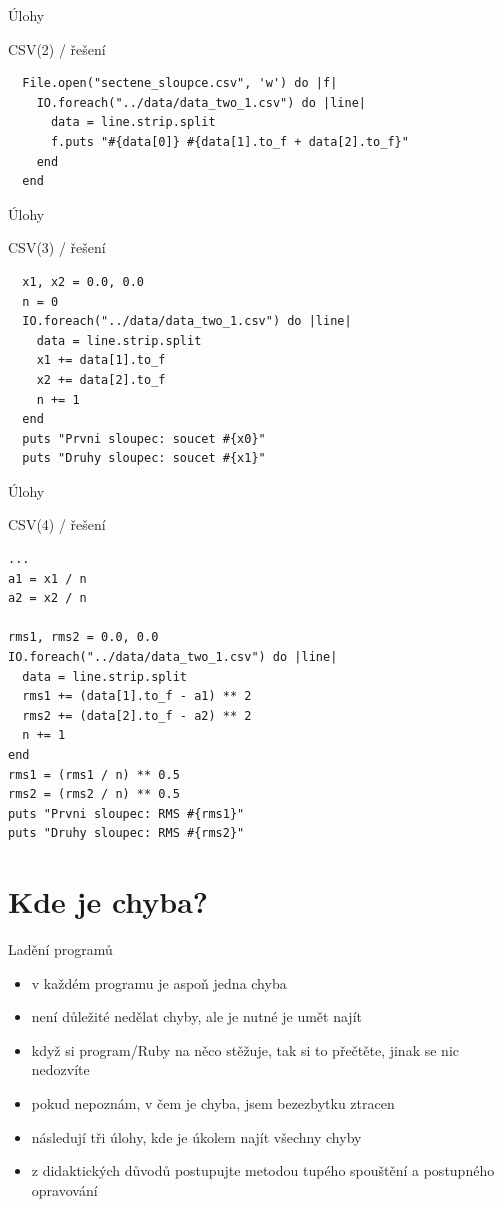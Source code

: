 \documentclass{beamer}
\begin{document}
\begin{frame}[fragile]{Úlohy}
  \begin{block}{CSV(2) / řešení}
    \scriptsize
\begin{verbatim}
  File.open("sectene_sloupce.csv", 'w') do |f|
    IO.foreach("../data/data_two_1.csv") do |line|
      data = line.strip.split
      f.puts "#{data[0]} #{data[1].to_f + data[2].to_f}"
    end
  end
\end{verbatim}
  \end{block}
\end{frame}

\begin{frame}[fragile]{Úlohy}
  \begin{block}{CSV(3) / řešení}
    \scriptsize
\begin{verbatim}
  x1, x2 = 0.0, 0.0
  n = 0
  IO.foreach("../data/data_two_1.csv") do |line|
    data = line.strip.split
    x1 += data[1].to_f
    x2 += data[2].to_f
    n += 1
  end
  puts "Prvni sloupec: soucet #{x0}"
  puts "Druhy sloupec: soucet #{x1}"
\end{verbatim}
  \end{block}
\end{frame}

\begin{frame}[fragile]{Úlohy}
  \begin{block}{CSV(4) / řešení}
    \scriptsize
\begin{verbatim}
...
a1 = x1 / n
a2 = x2 / n

rms1, rms2 = 0.0, 0.0
IO.foreach("../data/data_two_1.csv") do |line|
  data = line.strip.split
  rms1 += (data[1].to_f - a1) ** 2
  rms2 += (data[2].to_f - a2) ** 2
  n += 1
end
rms1 = (rms1 / n) ** 0.5
rms2 = (rms2 / n) ** 0.5
puts "Prvni sloupec: RMS #{rms1}"
puts "Druhy sloupec: RMS #{rms2}"
\end{verbatim}
  \end{block}
\end{frame}

\section{Kde je chyba?}

\begin{frame}{Ladění programů}
  \begin{itemize}
    \item v každém programu je aspoň jedna chyba
    \item není důležité nedělat chyby, ale je nutné je umět najít
    \item když si program/Ruby na něco stěžuje, tak si to přečtěte, jinak se nic nedozvíte
    \item pokud nepoznám, v čem je chyba, jsem bezezbytku ztracen
    \item následují tři úlohy, kde je úkolem najít všechny chyby
    \item z didaktických důvodů postupujte metodou tupého spouštění a postupného opravování
  \end{itemize}
\end{frame}
\end{document}
